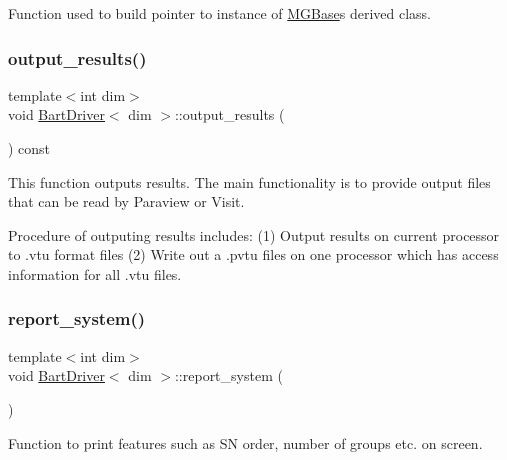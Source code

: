 Function used to build pointer to instance of \hyperlink{class_m_g_base}{M\+G\+Base}\textquotesingle{}s derived class. 

\mbox{\label{class_bart_driver_a1c440c9add7a5ec9d28afb7d44fa23d9}} 
\subsubsection{\texorpdfstring{output\+\_\+results()}{output\_results()}}
{\footnotesize\ttfamily template$<$int dim$>$ \\
void \hyperlink{class_bart_driver}{Bart\+Driver}$<$ dim $>$\+::output\+\_\+results (\begin{DoxyParamCaption}{ }\end{DoxyParamCaption}) const\hspace{0.3cm}{\ttfamily [private]}}

This function outputs results. The main functionality is to provide output files that can be read by Paraview or Visit.

Procedure of outputing results includes\+: (1) Output results on current processor to .vtu format files (2) Write out a .pvtu files on one processor which has access information for all .vtu files. \mbox{\label{class_bart_driver_aaf3b0ad2798c9add9e37ca0f649c416d}} 
\subsubsection{\texorpdfstring{report\+\_\+system()}{report\_system()}}
{\footnotesize\ttfamily template$<$int dim$>$ \\
void \hyperlink{class_bart_driver}{Bart\+Driver}$<$ dim $>$\+::report\+\_\+system (\begin{DoxyParamCaption}{ }\end{DoxyParamCaption})\hspace{0.3cm}{\ttfamily [private]}}



Function to print features such as SN order, number of groups etc. on screen. 

\mbox{\label{class_bart_driver_a20c70ef3733fc4406353e6fdfee6c684}} 
